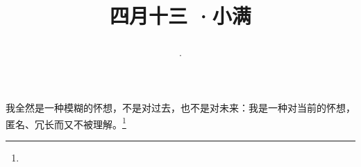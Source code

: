 \title{\date[d=20,m=5,y=2024][year:cn-y,年,month:cn,day:cn,日,·,weekday]·四月十三 ·小满}
我全然是一种模糊的怀想，不是对过去，也不是对未来：我是一种对当前的怀想，匿名、冗长而又不被理解。\footnote{ }

